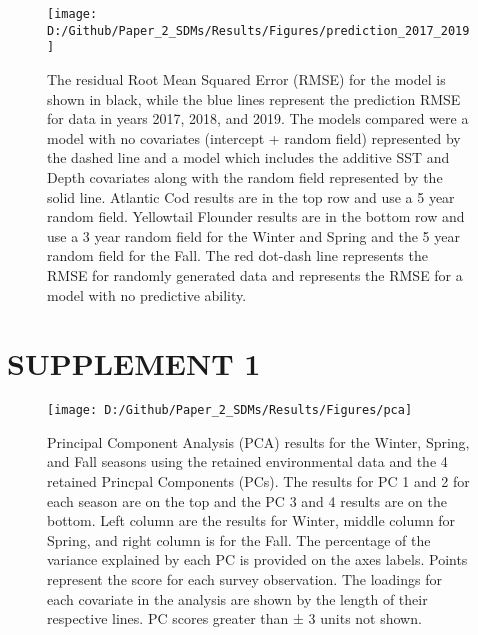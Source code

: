 \documentclass[
]{article}
\begin{document}
\begin{landscape}
\newpage
\begin{figure}
\texttt{[image: D:/Github/Paper\_2\_SDMs/Results/Figures/prediction\_2017\_2019]} \caption{The residual Root Mean Squared Error (RMSE) for the model is shown in black, while the blue lines represent the prediction RMSE for data in years 2017, 2018, and 2019. The models compared were a model with no covariates (intercept + random field) represented by the dashed line and a model which includes the additive SST and Depth covariates along with the random field represented by the solid line. Atlantic Cod results are in the top row and use a 5 year random field. Yellowtail Flounder results are in the bottom row and use a 3 year random field for the Winter and Spring and the 5 year random field for the Fall. The red dot-dash line represents the RMSE for randomly generated data and represents the RMSE for a model with no predictive ability.}\label{fig:pred-17-19}
\end{figure}

\end{landscape}

\newpage

\hypertarget{ref-sup}{%
\section{SUPPLEMENT 1}\label{ref-sup}}

\setcounter{table}{0}  \renewcommand{\thetable}{S\arabic{table}} \setcounter{figure}{0} \renewcommand{\thefigure}{S\arabic{figure}}

\newpage

\begin{figure}
\texttt{[image: D:/Github/Paper\_2\_SDMs/Results/Figures/pca]} \caption{Principal Component Analysis (PCA) results for the Winter, Spring, and Fall seasons using the retained environmental data and the 4 retained Princpal Components (PCs). The results for PC 1 and 2 for each season are on the top and the PC 3 and 4 results are on the bottom.  Left column are the results for Winter, middle column for Spring, and right column is for the Fall. The percentage of the variance explained by each PC is provided on the axes labels.  Points represent the score for each survey observation.  The loadings for each covariate in the analysis are shown by the length of their respective lines. PC scores greater than ± 3 units not shown.}\label{fig:PCA}
\end{figure}

\newpage
\end{document}

